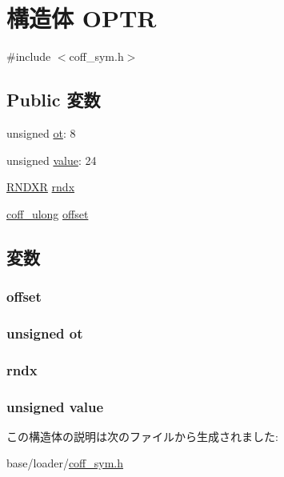 \hypertarget{structOPTR}{
\section{構造体 OPTR}
\label{structOPTR}
}


{\ttfamily \#include $<$coff\_\-sym.h$>$}\subsection*{Public 変数}
\begin{DoxyCompactItemize}
\item 
unsigned \hyperlink{structOPTR_a4f30504d90d863215719b9cfd2b8ce90}{ot}: 8
\item 
unsigned \hyperlink{structOPTR_af6d3658bf68f75faf59f2a08f4c4fad1}{value}: 24
\item 
\hyperlink{structRNDXR}{RNDXR} \hyperlink{structOPTR_a5922441bb6d02af2cb6d840862a40226}{rndx}
\item 
\hyperlink{ecoff__machdep_8h_a8465ac1e3c6711a52d3103550d8122fc}{coff\_\-ulong} \hyperlink{structOPTR_afa0c3915b53566ae509a07b45f549627}{offset}
\end{DoxyCompactItemize}


\subsection{変数}
\hypertarget{structOPTR_afa0c3915b53566ae509a07b45f549627}{
\subsubsection[{offset}]{ {\bf offset}}}
\label{structOPTR_afa0c3915b53566ae509a07b45f549627}
\hypertarget{structOPTR_a4f30504d90d863215719b9cfd2b8ce90}{
\subsubsection[{ot}]{\setlength{\rightskip}{0pt plus 5cm}unsigned {\bf ot}}}
\label{structOPTR_a4f30504d90d863215719b9cfd2b8ce90}
\hypertarget{structOPTR_a5922441bb6d02af2cb6d840862a40226}{
\subsubsection[{rndx}]{ {\bf rndx}}}
\label{structOPTR_a5922441bb6d02af2cb6d840862a40226}
\hypertarget{structOPTR_af6d3658bf68f75faf59f2a08f4c4fad1}{
\subsubsection[{value}]{\setlength{\rightskip}{0pt plus 5cm}unsigned {\bf value}}}
\label{structOPTR_af6d3658bf68f75faf59f2a08f4c4fad1}


この構造体の説明は次のファイルから生成されました:\begin{DoxyCompactItemize}
\item 
base/loader/\hyperlink{coff__sym_8h}{coff\_\-sym.h}\end{DoxyCompactItemize}
